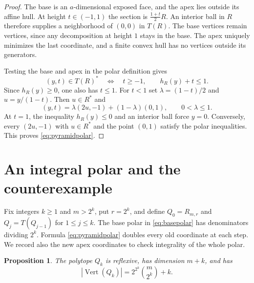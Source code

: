 \documentclass[11pt]{article}
\newtheorem{proposition}[theorem]{Proposition}
\newcommand{\vertices}{\operatorname{Vert}}
\begin{document}
\begin{proof}
The base is an $a$-dimensional exposed face, and the apex lies outside its
affine hull. At height $t\in(-1,1)$ the section is $\frac{1+t}{2}R$.
An interior ball in $R$ therefore supplies a neighborhood of $(0,0)$
in $T(R)$. The base vertices remain vertices, since any decomposition at
height $1$ stays in the base. The apex uniquely minimizes the last
coordinate, and a finite convex hull has no vertices outside its generators.

Testing the base and apex in the polar definition gives
\[
 (y,t)\in T(R)^*\quad\Longleftrightarrow\quad
 t\geq-1,\qquad h_R(y)+t\leq1.
\]
Since $h_R(y)\geq0$, one also has $t\leq1$. For $t<1$ set
$\lambda=(1-t)/2$ and $u=y/(1-t)$. Then $u\in R^*$ and
\[
 (y,t)=\lambda(2u,-1)+(1-\lambda)(0,1),\qquad 0<\lambda\leq1.
\]
At $t=1$, the inequality $h_R(y)\leq0$ and an interior ball force $y=0$.
Conversely, every $(2u,-1)$ with $u\in R^*$ and the point $(0,1)$ satisfy
the polar inequalities. This proves \eqref{eq:pyramidpolar}.
\end{proof}

\section{An integral polar and the counterexample}

Fix integers $k\geq1$ and $m>2^k$, put $r=2^k$, and define
$Q_0=R_{m,r}$ and $Q_j=T(Q_{j-1})$ for $1\leq j\leq k$.
The base polar in \eqref{eq:basepolar} has denominators dividing $2^k$.
Formula \eqref{eq:pyramidpolar} doubles every old coordinate at each step.
We record also the new apex coordinates to check integrality of the whole
polar.

\begin{proposition}\label{prop:family}
The polytope $Q_k$ is reflexive, has dimension $m+k$, and has
\[
 |\vertices(Q_k)|=2^{2^k}\binom{m}{2^k}+k.
\]
\end{proposition}
\end{document}
